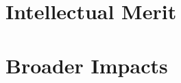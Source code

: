 \documentclass[11pt]{amsart}
\theoremstyle{plain}
\theoremstyle{definition}
\numberwithin{equation}{section}
\begin{document}
\section{Intellectual Merit}\label{S:merit}

\section{Broader Impacts}\label{S:impact}


\newpage\label{S:bibstart}


\end{document}
